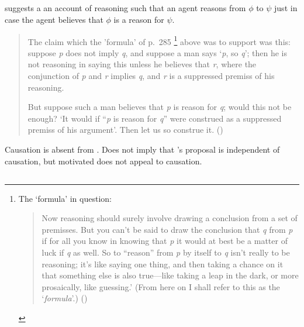 \subsection{\textcite{Thomson:1965vv}}

\begin{note}
  \citeauthor{Thomson:1965vv} suggests a an account of reasoning such that an agent reasons from \(\phi\) to \(\psi\) just in case the agent believes that \(\phi\) is a reason for \(\psi\).
  \begin{quote}
    The claim which the 'formula' of p.\ 285\nolinebreak
    \footnote{
      The `formula' in question:
      \begin{quote}
        Now reasoning should surely involve drawing a conclusion from a set of premisses.
        But you can't be said to draw the conclusion that \emph{q} from \emph{p} if for all you know in knowing that \emph{p} it would at best be a matter of luck if \emph{q} as well.
        So to ``reason'' from \emph{p} by itself to \emph{q} isn't really to be reasoning; it's like saying one thing, and then taking a chance on it that something else is also true---like taking a leap in the dark, or more prosaically, like guessing.'
        (From here on I shall refer to this as the `\emph{formula}'.)\nolinebreak
        \mbox{}\hfill\mbox{(\citeyear[285]{Thomson:1965vv})}
      \end{quote}
    }
    above was to support was this:
    suppose \emph{p} does not imply \emph{q}, and suppose a man says `\emph{p}, so \emph{q}';
    then he is not reasoning in saying this unless he believes that \emph{r}, where the conjunction of \emph{p} and \emph{r} implies \emph{q}, and \emph{r} is a suppressed premiss of his reasoning.\par
    But suppose such a man believes that \emph{p} is reason for \emph{q}; would this not be enough?
    `It would if ``\emph{p} is reason for \emph{q}'' were construed as a suppressed premiss of his argument'.
    Then let us so construe it.\newline
    \mbox{}\hfill\mbox{(\citeyear[294]{Thomson:1965vv})}
  \end{quote}
  Causation is absent from \citeauthor{Thomson:1965vv}.
  Does not imply that \citeauthor{Thomson:1965vv}'s proposal is independent of causation, but motivated does not appeal to causation.
\end{note}

\subsection{\textcite{Longino:1978wv}}

